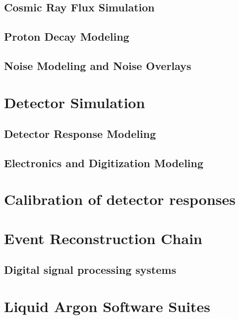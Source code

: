 \subsection{Cosmic Ray Flux Simulation}
\subsection{Proton Decay Modeling}
\subsection{Noise Modeling and Noise Overlays}

\section{Detector Simulation}
\subsection{Detector Response Modeling}
\subsection{Electronics and Digitization Modeling}

\section{Calibration of detector responses}

\section{Event Reconstruction Chain}
\subsection{Digital signal processing systems}

\section{Liquid Argon Software Suites}

